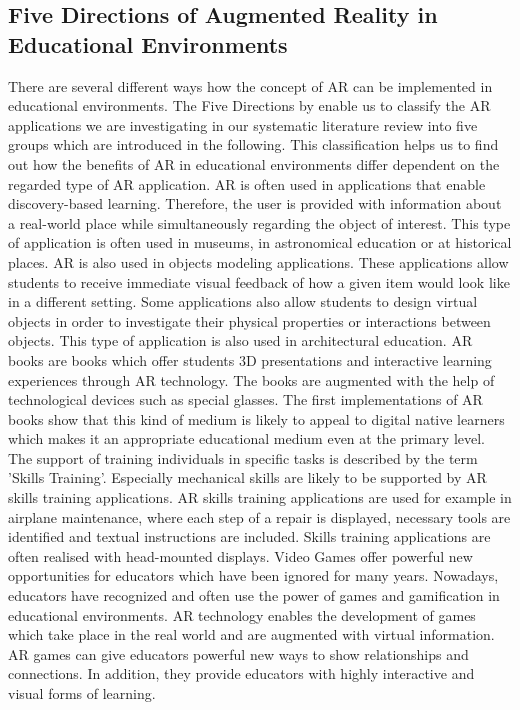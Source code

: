 \subsection[Five Directions of Augmented Reality in Educational Environments]{Five Directions of Augmented Reality in Educational Environments\autocite[\label{fn:Yuen_2011_126_130}cf.][126-130]{Yuen.2011}}
There are several different ways how the concept of AR can be implemented in educational environments.\mulcit\autocite[cf.][14-18]{Lee.2012} The Five Directions by \cite{Yuen.2011} enable us to classify the AR applications we are investigating in our systematic literature review into five groups which are introduced in the following. This classification helps us to find out how the benefits of AR in educational environments differ dependent on the regarded type of AR application.
\heading{\DBL}
AR is often used in applications that enable discovery-based learning. Therefore, the user is provided with information about a real-world place while simultaneously regarding the object of interest. This type of application is often used in museums, in astronomical education or at historical places.
\heading{\OM}
AR is also used in objects modeling applications. These applications allow students to receive immediate visual feedback of how a given item would look like in a different setting. Some applications also allow students to design virtual objects in order to investigate their physical properties or interactions between objects. This type of application is also used in architectural education.
\heading{\ARB}
AR books are books which offer students 3D presentations and interactive learning experiences through AR technology. The books are augmented with the help of technological devices such as special glasses. The first implementations of AR books show that this kind of medium is likely to appeal to digital native learners which makes it an appropriate educational medium even at the primary level.
\heading{\ST}
The support of training individuals in specific tasks is described by the term 'Skills Training'. Especially mechanical skills are likely to be supported by AR skills training applications. AR skills training applications are used for example in airplane maintenance, where each step of a repair is displayed, necessary tools are identified and textual instructions are included. Skills training applications are often realised with head-mounted displays. 
\heading{\ARG}
Video Games offer powerful new opportunities for educators which have been ignored for many years. \autocite[cf.][2]{Squire.2003} %
Nowadays, educators have recognized and often use the power of games and gamification in educational environments. AR technology enables the development of games which take place in the real world and are augmented with virtual information. AR games can give educators powerful new ways to show relationships and connections. In addition, they provide educators with highly interactive and visual forms of learning.